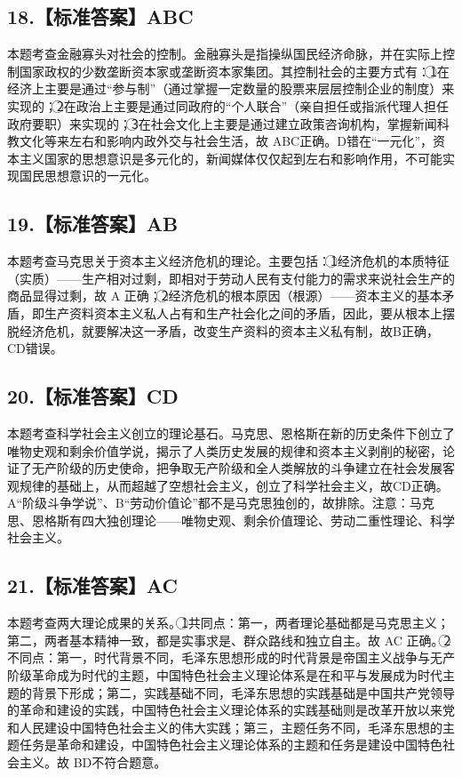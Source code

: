 \documentclass[UTF8,11pt]{ctexart}
\begin{document}
\subsection*{18.【标准答案】ABC}

本题考查金融寡头对社会的控制。金融寡头是指操纵国民经济命脉，并在实际上控制国家政权的少数垄断资本家或垄断资本家集团。其控制社会的主要方式有：\textcircled{1}在经济上主要是通过“参与制”（通过掌握一定数量的股票来层层控制企业的制度）来实现的；\textcircled{2}在政治上主要是通过同政府的“个人联合”（亲自担任或指派代理人担任政府要职）来实现的；\textcircled{3}在社会文化上主要是通过建立政策咨询机构，掌握新闻科教文化等来左右和影响内政外交与社会生活，故 ABC正确。D错在“一元化”，资本主义国家的思想意识是多元化的，新闻媒体仅仅起到左右和影响作用，不可能实现国民思想意识的一元化。


\subsection*{19.【标准答案】AB}

本题考查马克思关于资本主义经济危机的理论。主要包括：\textcircled{1}经济危机的本质特征（实质）——生产相对过剩，即相对于劳动人民有支付能力的需求来说社会生产的商品显得过剩，故 A 正确；\textcircled{2}经济危机的根本原因（根源）——资本主义的基本矛盾，即生产资料资本主义私人占有和生产社会化之间的矛盾，因此，要从根本上摆脱经济危机，就要解决这一矛盾，改变生产资料的资本主义私有制，故B正确，CD错误。


\subsection*{20.【标准答案】CD}

本题考查科学社会主义创立的理论基石。马克思、恩格斯在新的历史条件下创立了唯物史观和剩余价值学说，揭示了人类历史发展的规律和资本主义剥削的秘密，论证了无产阶级的历史使命，把争取无产阶级和全人类解放的斗争建立在社会发展客观规律的基础上，从而超越了空想社会主义，创立了科学社会主义，故CD正确。A“阶级斗争学说”、B“劳动价值论”都不是马克思独创的，故排除。注意：马克思、恩格斯有四大独创理论——唯物史观、剩余价值理论、劳动二重性理论、科学社会主义。


\subsection*{21.【标准答案】AC}

本题考查两大理论成果的关系。\textcircled{1}共同点：第一，两者理论基础都是马克思主义；第二，两者基本精神一致，都是实事求是、群众路线和独立自主。故 AC 正确。\textcircled{2}不同点：第一，时代背景不同，毛泽东思想形成的时代背景是帝国主义战争与无产阶级革命成为时代的主题，中国特色社会主义理论体系是在和平与发展成为时代主题的背景下形成；第二，实践基础不同，毛泽东思想的实践基础是中国共产党领导的革命和建设的实践，中国特色社会主义理论体系的实践基础则是改革开放以来党和人民建设中国特色社会主义的伟大实践；第三，主题任务不同，毛泽东思想的主题任务是革命和建设，中国特色社会主义理论体系的主题和任务是建设中国特色社会主义。故 BD不符合题意。
\end{document}
